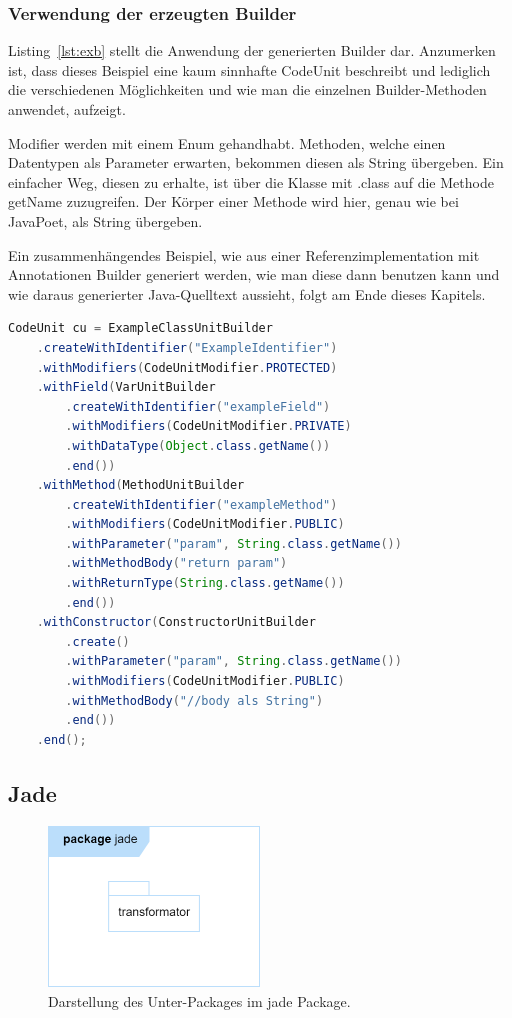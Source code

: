\documentclass[12pt,oneside,a4paper,parskip]{scrbook}
\begin{document}
\subsubsection{Verwendung der erzeugten Builder}

Listing~\ref{lst:exb} stellt die Anwendung der generierten Builder dar. Anzumerken ist, dass dieses Beispiel eine kaum sinnhafte CodeUnit beschreibt und lediglich die verschiedenen Möglichkeiten und wie man die einzelnen Builder-Methoden anwendet, aufzeigt.

Modifier werden mit einem Enum gehandhabt. Methoden, welche einen Datentypen als Parameter erwarten, bekommen diesen als String übergeben. Ein einfacher Weg, diesen zu erhalte, ist über die Klasse mit .class auf die Methode getName zuzugreifen. Der Körper einer Methode wird hier, genau wie bei JavaPoet, als String übergeben.

Ein zusammenhängendes Beispiel, wie aus einer Referenzimplementation mit Annotationen Builder generiert werden, wie man diese dann benutzen kann und wie daraus generierter Java-Quelltext aussieht, folgt am Ende dieses Kapitels.

\begin{lstlisting}[label=lst:exb,
language=java,
firstnumber=1,
caption=Quelltext zur Verwendung verschiedener erzeugter Builder.]
CodeUnit cu = ExampleClassUnitBuilder
	.createWithIdentifier("ExampleIdentifier")
	.withModifiers(CodeUnitModifier.PROTECTED)
	.withField(VarUnitBuilder
		.createWithIdentifier("exampleField")
		.withModifiers(CodeUnitModifier.PRIVATE)
		.withDataType(Object.class.getName())
		.end())
	.withMethod(MethodUnitBuilder
		.createWithIdentifier("exampleMethod")
		.withModifiers(CodeUnitModifier.PUBLIC)
		.withParameter("param", String.class.getName())
		.withMethodBody("return param")
		.withReturnType(String.class.getName())
		.end())
	.withConstructor(ConstructorUnitBuilder
		.create()
		.withParameter("param", String.class.getName())
		.withModifiers(CodeUnitModifier.PUBLIC)
		.withMethodBody("//body als String")
		.end())
	.end();
\end{lstlisting}

\subsection{Jade}

\begin{figure}[htbp]
\centering
\includegraphics[width=0.5\textwidth]{bilder/jade}
\caption{Darstellung des Unter-Packages im jade Package.}
\label{fig:jadePackages}
\end{figure}
\end{document}
